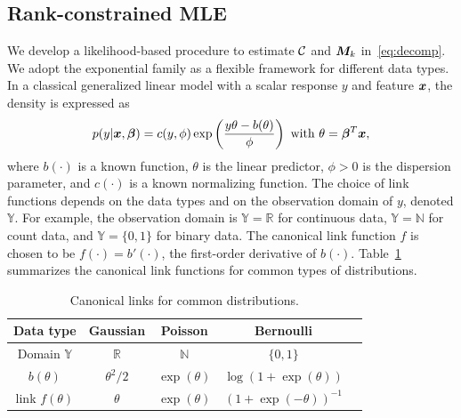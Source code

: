 \documentclass[12pt]{article}
\theoremstyle{definition}
\theoremstyle{definition}
\begin{document}
\subsection{Rank-constrained MLE}\label{sec:rankM}
We develop a likelihood-based procedure to estimate $\mathcal{C}$ and $\bm M_k$ in~\eqref{eq:decomp}. We adopt the exponential family as a flexible framework for different data types. In a classical generalized linear model with a scalar response $y$ and feature $\bm x$, the density is expressed as
\[
p(y|\mx, \boldsymbol{\beta})=c(y,\phi)\exp\left(\frac{y\theta- b(\theta)}{\phi}\right)\ \text{with}\ \theta=\boldsymbol{\beta}^T\mx,
\]
where $b(\cdot)$ is a known function, $\theta$ is the linear predictor, $\phi>0$ is the dispersion parameter, and $c(\cdot)$ is a known normalizing function. The choice of link functions depends on the data types and on the observation domain of $y$, denoted $\mathbb{Y}$. For example, the observation domain is $\mathbb{Y}=\mathbb{R}$ for continuous data, $\mathbb{Y}=\mathbb{N}$ for count data, and  $\mathbb{Y}=\{0,1\}$ for binary data. The canonical link function $f$ is chosen to be $f(\cdot)=b'(\cdot)$, the first-order derivative of $b(\cdot)$. Table~\ref{table:link} summarizes the canonical link functions for common types of distributions. 

\begin{table}[htb]
\centering
\begin{tabular}{c|cccc}
Data type &Gaussian & Poisson& Bernoulli &  \\
\hline
Domain $\mathbb{Y}$& $\mathbb{R}$&$\mathbb{N}$&$\{0,1\}$  \\
 $b(\theta)$&$\theta^2/2$& $\exp(\theta)$&$\log (1+\exp(\theta))$  \\
 link $f(\theta)$&$\theta$&$\exp(\theta)$&$(1+\exp(-\theta))^{-1}$ \\
\end{tabular}
\caption{Canonical links for common distributions.}\label{table:link}
\end{table}
\end{document}
